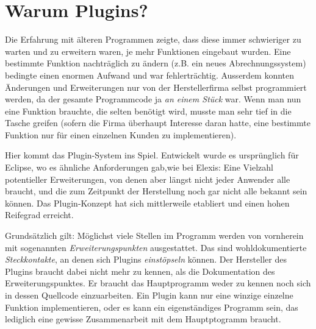 
\section{Warum Plugins?}
\label{expl:plugins}
Die Erfahrung mit älteren Programmen zeigte, dass diese immer schwieriger zu warten und zu erweitern waren, je mehr Funktionen eingebaut wurden. Eine bestimmte Funktion nachträglich zu ändern (z.B. ein neues Abrechnungssystem) bedingte einen enormen Aufwand und war fehlerträchtig. Ausserdem konnten Änderungen und Erweiterungen nur von der Herstellerfirma selbst programmiert werden, da der gesamte Programmcode ja \textit{an einem Stück} war. Wenn man nun eine Funktion brauchte, die selten benötigt wird, musste man sehr tief in die Tasche greifen (sofern die Firma überhaupt Interesse daran hatte, eine bestimmte Funktion nur für einen einzelnen Kunden zu implementieren).

Hier kommt das Plugin-System ins Spiel. Entwickelt wurde es ursprünglich für Eclipse, wo es ähnliche Anforderungen gab,wie bei Elexis: Eine Vielzahl potentieller Erweiterungen, von denen aber längst nicht jeder Anwender alle braucht, und die zum Zeitpunkt der Herstellung noch gar nicht alle bekannt sein können. Das Plugin-Konzept hat sich mittlerweile etabliert und einen hohen Reifegrad erreicht.

Grundsätzlich gilt: Möglichst viele Stellen im Programm werden von vornherein mit sogenannten \textit{Erweiterungspunkten} ausgestattet. Das sind wohldokumentierte \textit{Steckkontakte}, an denen sich Plugins \textit{einstöpseln} können. Der Hersteller des Plugins braucht dabei nicht mehr zu kennen, als die Dokumentation des Erweiterungspunktes. Er braucht das Hauptprogramm weder zu kennen noch sich in dessen Quellcode einzuarbeiten. Ein Plugin kann nur eine winzige einzelne Funktion implementieren, oder es kann ein eigenständiges Programm sein, das lediglich eine gewisse Zusammenarbeit mit dem Hauptptogramm braucht.

